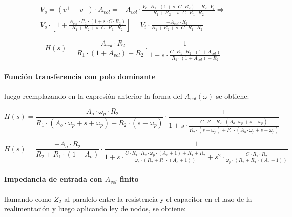 \begin{align*}
	V_o = (v^{+} - v^{-}) \cdot A_{vol} = - A_{vol} \cdot \frac{V_o \cdot R_1 \cdot ( 1 + s \cdot C \cdot R_2) + R_2 \cdot V_i}{R_1 + R_2 + s \cdot C \cdot R_1 \cdot R_2} \Rightarrow \\
	V_o \cdot \left[ 1 + \frac{A_{vol} \cdot R_1 \cdot ( 1 + s \cdot C \cdot R_2)}{R_1 + R_2 + s \cdot C \cdot R_1 \cdot R_2} \right] =
	V_i \cdot \frac{-A_{vol} \cdot R_2}{R_1 + R_2 + s \cdot C \cdot R_1 \cdot R_2} 
\end{align*}

\begin{equation}
	H(s) = \frac{- A_{vol} \cdot R_2}{R_1 \cdot ( 1 + A_{vol} ) + R_2} \cdot \frac{1}{1 + s \cdot \frac{C \cdot R_1 \cdot R_2 \cdot ( 1 + A_{vol})}{R_1 \cdot (1 + A_{vol}) + R_2}}
	\label{eq:integrador_compensado_transfer_avol_finito}
\end{equation}

\paragraph*{Funci\'on transferencia con polo dominante} luego reemplazando en la expresi\'on anterior la forma del $A_{vol}(\omega)$ se obtiene:

\begin{equation*}
	H(s) = \frac{-A_o \cdot \omega_p \cdot R_2}{R_1 \cdot ( A_o \cdot \omega_p + s + \omega_p) + R_2 \cdot (s + \omega_p)} \cdot \frac{1}{1 + s \cdot \frac{C \cdot R_1 \cdot R_2 \cdot ( A_o \cdot \omega_p + s + \omega_p)}{R_2 \cdot ( s + \omega_p) + R_1 \cdot (A_o \cdot \omega_p + s + \omega_p)}}
\end{equation*}

\begin{equation}
	H(s) = \frac{-A_o \cdot R_2}{R_2 + R_1 \cdot (1+A_o)} \cdot \frac{1}{1 + s \cdot \frac{C \cdot R_1 \cdot R_2 \cdot \omega_p \cdot (A_o + 1) + R_1 + R_2}{\omega_p \cdot (R_2 + R_1 \cdot(A_o + 1))} + s^{2} \cdot \frac{C \cdot R_1 \cdot R_2}{\omega_p \cdot (R_2 + R_1 \cdot (A_o + 1))}}
	\label{eq:integrador_compensado_transfer_polo_dominante}
\end{equation}

\paragraph*{Impedancia de entrada con $A_{vol}$ finito} llamando como $Z_2$ al paralelo entre la resistencia y el capacitor en el lazo de la realimentaci\'on y luego aplicando ley de nodos, se obtiene:

